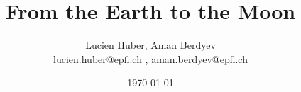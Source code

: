 \documentclass[a4paper,12pt]{article}
\newcommand{\mail}[1]{{\href{mailto:#1}{#1}}} %
\begin{document}
\title{From the Earth to the Moon}
\author{Lucien Huber, Aman Berdyev \\
{\small \mail{lucien.huber@epfl.ch} , \mail{aman.berdyev@epfl.ch}}}
\date{\today}
\maketitle
    
\end{document}
